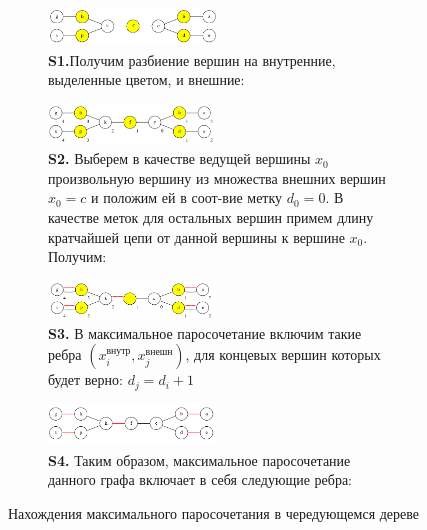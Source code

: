 \documentclass{article}
\begin{document}
\begin{enumerate}
\begin{figure}[!htp]
\begin{subfigure}{\textwidth}
\caption*{\textbf{S1.}Получим разбиение вершин на внутренние, выделенные цветом, и внешние:}
\centering
\includegraphics[width=0.49\textwidth]{attachments/13/1.png}
\end{subfigure}
\vspace{10px}
\begin{subfigure}{\textwidth}
\centering
\caption*{\textbf{S2.} Выберем в качестве ведущей вершины $x_0$ произвольную вершину из множества внешних вершин
$x_0 = c$ и положим ей в соот-вие метку $d_0 = 0$.
В качестве меток для остальных вершин примем длину кратчайшей цепи от данной вершины к вершине $x_0$. Получим:}
\includegraphics[width=0.49\textwidth]{attachments/13/2.png}
\end{subfigure}
\vspace{10px}
\begin{subfigure}{\textwidth}
\centering
\caption*{\textbf{S3.} В максимальное паросочетание включим такие ребра $( x_i^{внутр}, x_j^{внешн})$, 
для концевых вершин которых будет верно: $d_j = d_i + 1$}
\includegraphics[width=0.49\textwidth]{attachments/13/3_coloured.png}
\end{subfigure}
\vspace{10px}
\begin{subfigure}{\textwidth}
\caption*{\textbf{S4.} Таким образом, максимальное паросочетание данного графа включает в себя следующие ребра:}
\centering
\includegraphics[width=0.49\textwidth]{attachments/13/3.png}
\end{subfigure}
\caption{Нахождения максимального паросочетания в чередующемся дереве}
\label{fig:13_steptrees}
\end{figure}

\end{enumerate}
\end{document}
